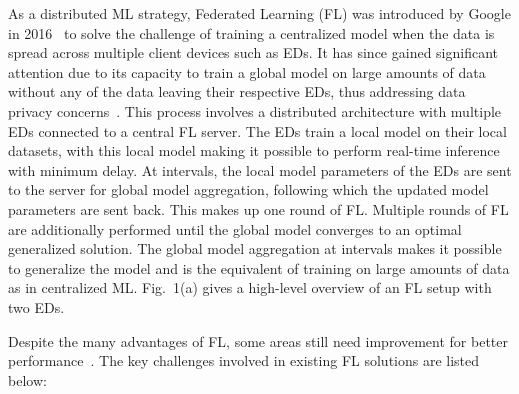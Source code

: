 \documentclass[journal]{IEEEtran}
\begin{document}
As a distributed ML strategy, Federated Learning (FL) was introduced by Google in 2016~\cite{fedavg-introduction} to solve the challenge of training a centralized model when the data is spread across multiple client devices such as EDs. It has since gained significant attention due to its capacity to train a global model on large amounts of data without any of the data leaving their respective EDs, thus addressing data privacy concerns~\cite{singh2025hybrid}. This process involves a distributed architecture with multiple EDs connected to a central FL server. The EDs train a local model on their local datasets, with this local model making it possible to perform real-time inference with minimum delay. At intervals, the local model parameters of the EDs are sent to the server for global model aggregation, following which the updated model parameters are sent back. This makes up one round of FL. Multiple rounds of FL are additionally performed until the global model converges to an optimal generalized solution. The global model aggregation at intervals makes it possible to generalize the model and is the equivalent of training on large amounts of data as in centralized ML. Fig.~1(a) gives a high-level overview of an FL setup with two EDs.

 
Despite the many advantages of FL, some areas still need improvement for better performance~\cite{fl-recent-survey}. The key challenges involved in existing FL solutions are listed below: 
\end{document}

